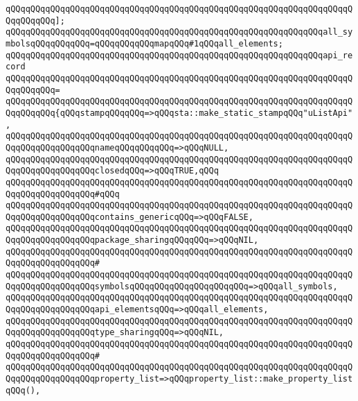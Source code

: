 \verb|qQQqqQQqqQQqqQQqqQQqqQQqqQQqqQQqqQQqqQQqqQQqqQQqqQQqqQQqqQQqqQQqqQQqqQQqqQQqqQQq];|\newline
\newline
\verb|qQQqqQQqqQQqqQQqqQQqqQQqqQQqqQQqqQQqqQQqqQQqqQQqqQQqqQQqqQQqqQQqall_symbolsqQQqqQQqqQQq=qQQqqQQqqQQqmapqQQq#1qQQqall_elements;|\newline
\newline
\verb|qQQqqQQqqQQqqQQqqQQqqQQqqQQqqQQqqQQqqQQqqQQqqQQqqQQqqQQqqQQqqQQqapi_record|\newline
\verb|qQQqqQQqqQQqqQQqqQQqqQQqqQQqqQQqqQQqqQQqqQQqqQQqqQQqqQQqqQQqqQQqqQQqqQQqqQQqqQQq=|\newline
\verb|qQQqqQQqqQQqqQQqqQQqqQQqqQQqqQQqqQQqqQQqqQQqqQQqqQQqqQQqqQQqqQQqqQQqqQQqqQQqqQQq{qQQqstampqQQqqQQq=>qQQqsta::make_static_stampqQQq"uListApi",|\newline
\verb|qQQqqQQqqQQqqQQqqQQqqQQqqQQqqQQqqQQqqQQqqQQqqQQqqQQqqQQqqQQqqQQqqQQqqQQqqQQqqQQqqQQqqQQqnameqQQqqQQqqQQq=>qQQqNULL,|\newline
\verb|qQQqqQQqqQQqqQQqqQQqqQQqqQQqqQQqqQQqqQQqqQQqqQQqqQQqqQQqqQQqqQQqqQQqqQQqqQQqqQQqqQQqqQQqclosedqQQq=>qQQqTRUE,qQQq|\newline
\verb|qQQqqQQqqQQqqQQqqQQqqQQqqQQqqQQqqQQqqQQqqQQqqQQqqQQqqQQqqQQqqQQqqQQqqQQqqQQqqQQqqQQqqQQq#qQQq|\newline
\verb|qQQqqQQqqQQqqQQqqQQqqQQqqQQqqQQqqQQqqQQqqQQqqQQqqQQqqQQqqQQqqQQqqQQqqQQqqQQqqQQqqQQqqQQqcontains_genericqQQq=>qQQqFALSE,|\newline
\verb|qQQqqQQqqQQqqQQqqQQqqQQqqQQqqQQqqQQqqQQqqQQqqQQqqQQqqQQqqQQqqQQqqQQqqQQqqQQqqQQqqQQqqQQqpackage_sharingqQQqqQQq=>qQQqNIL,|\newline
\verb|qQQqqQQqqQQqqQQqqQQqqQQqqQQqqQQqqQQqqQQqqQQqqQQqqQQqqQQqqQQqqQQqqQQqqQQqqQQqqQQqqQQqqQQq#|\newline
\verb|qQQqqQQqqQQqqQQqqQQqqQQqqQQqqQQqqQQqqQQqqQQqqQQqqQQqqQQqqQQqqQQqqQQqqQQqqQQqqQQqqQQqqQQqsymbolsqQQqqQQqqQQqqQQqqQQqqQQq=>qQQqall_symbols,|\newline
\verb|qQQqqQQqqQQqqQQqqQQqqQQqqQQqqQQqqQQqqQQqqQQqqQQqqQQqqQQqqQQqqQQqqQQqqQQqqQQqqQQqqQQqqQQqapi_elementsqQQq=>qQQqall_elements,|\newline
\verb|qQQqqQQqqQQqqQQqqQQqqQQqqQQqqQQqqQQqqQQqqQQqqQQqqQQqqQQqqQQqqQQqqQQqqQQqqQQqqQQqqQQqqQQqtype_sharingqQQq=>qQQqNIL,|\newline
\verb|qQQqqQQqqQQqqQQqqQQqqQQqqQQqqQQqqQQqqQQqqQQqqQQqqQQqqQQqqQQqqQQqqQQqqQQqqQQqqQQqqQQqqQQq#|\newline
\verb|qQQqqQQqqQQqqQQqqQQqqQQqqQQqqQQqqQQqqQQqqQQqqQQqqQQqqQQqqQQqqQQqqQQqqQQqqQQqqQQqqQQqqQQqproperty_list=>qQQqproperty_list::make_property_listqQQq(),|\newline
